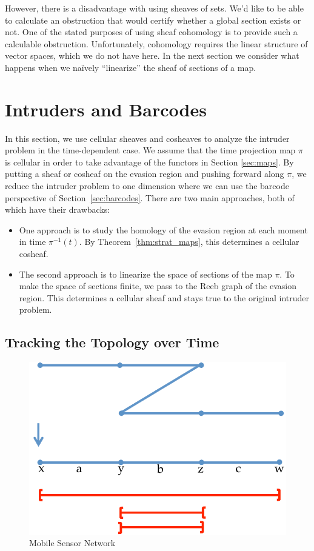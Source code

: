 However, there is a disadvantage with using sheaves of sets. We'd like to be able to calculate an obstruction that would certify whether a global section exists or not. One of the stated purposes of using sheaf cohomology is to provide such a calculable obstruction. Unfortunately, cohomology requires the linear structure of vector spaces, which we do not have here. In the next section we consider what happens when we na\"ively ``linearize'' the sheaf of sections of a map.

\section{Intruders and Barcodes}
\label{subsec:intruder_bcs}

In this section, we use cellular sheaves and cosheaves to analyze the intruder problem in the time-dependent case. We assume that the time projection map $\pi$ is cellular in order to take advantage of the functors in Section \ref{sec:maps}.
By putting a sheaf or cosheaf on the evasion region and pushing forward along $\pi$, we reduce the intruder problem to one dimension where we can use the barcode perspective of Section~\ref{sec:barcodes}. There are two main approaches, both of which have their drawbacks:

\begin{itemize}
	\item One approach is to study the homology of the evasion region at each moment in time $\pi^{-1}(t)$. By Theorem~\ref{thm:strat_maps}, this determines a cellular cosheaf.
	\item The second approach is to linearize the space of sections of the map $\pi$. To make the space of sections finite, we pass to the Reeb graph of the evasion region. This determines a cellular sheaf and stays true to the original intruder problem.
\end{itemize}

\subsection{Tracking the Topology over Time}
\label{subsubsec:ttt_bcs}

\begin{figure}
\begin{center}
\includegraphics[width=.7\textwidth]{mobile_reeb_bc_new.pdf}
\caption{Mobile Sensor Network}
\label{fig:mobile_reeb_bc}
\end{center}
\end{figure}

